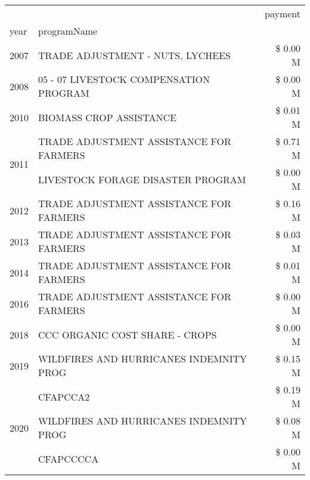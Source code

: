 \begin{tabular}{llr}
\toprule
 &  & payment \\
year & programName &  \\
\midrule
2007 & TRADE ADJUSTMENT - NUTS, LYCHEES & \$ 0.00 M \\
\cline{1-3}
2008 & 05 - 07 LIVESTOCK COMPENSATION PROGRAM & \$ 0.00 M \\
\cline{1-3}
2010 & BIOMASS CROP ASSISTANCE & \$ 0.01 M \\
\cline{1-3}
\multirow[t]{2}{*}{2011} & TRADE ADJUSTMENT ASSISTANCE FOR FARMERS & \$ 0.71 M \\
 & LIVESTOCK FORAGE DISASTER PROGRAM & \$ 0.00 M \\
\cline{1-3}
2012 & TRADE ADJUSTMENT ASSISTANCE FOR FARMERS & \$ 0.16 M \\
\cline{1-3}
2013 & TRADE ADJUSTMENT ASSISTANCE FOR FARMERS & \$ 0.03 M \\
\cline{1-3}
2014 & TRADE ADJUSTMENT ASSISTANCE FOR FARMERS & \$ 0.01 M \\
\cline{1-3}
2016 & TRADE ADJUSTMENT ASSISTANCE FOR FARMERS       & \$ 0.00 M \\
\cline{1-3}
2018 & CCC ORGANIC COST SHARE - CROPS & \$ 0.00 M \\
\cline{1-3}
2019 & WILDFIRES AND HURRICANES INDEMNITY PROG & \$ 0.15 M \\
\cline{1-3}
\multirow[t]{3}{*}{2020} & CFAPCCA2 & \$ 0.19 M \\
 & WILDFIRES AND HURRICANES INDEMNITY PROG & \$ 0.08 M \\
 & CFAPCCCCA & \$ 0.00 M \\
\cline{1-3}
\bottomrule
\end{tabular}
